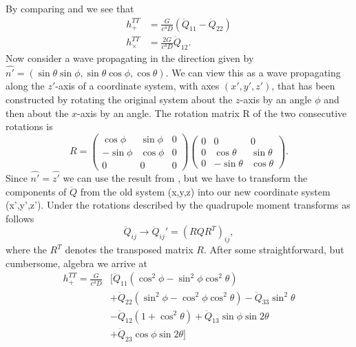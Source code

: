 By comparing  and  we see that
\begin{align} \label{eqT:zhchx}
h_{+}^{TT} &= \frac{G}{c^4 D} (\ddot{Q}_{11}-\ddot{Q}_{22}) \\ \nonumber
h_{\times}^{TT} &= \frac{2G}{c^4 D} \ddot{Q}_{12}.
\end{align}
Now consider a wave propagating in the direction given by $\hat{n'} = (\sin{\theta} \sin{\phi}, \sin{\theta} \cos{\phi},\cos{\theta})$.
We can view this as a wave propagating along the $z'$-axis of a coordinate system, with axes $(x',y',z')$, that has been constructed  
by rotating the original system about the $z$-axis by an angle $\phi$ and then about the $x$-axis by an angle.
The rotation matrix R of the two consecutive rotations is
\begin{equation} \label{eqT:pjz}
R = 
  \begin{pmatrix}
    \cos{\phi} & \sin{\phi} & 0  \\
    -\sin{\phi} & \cos{\phi} & 0 \\
    0 & 0 & 0
  \end{pmatrix}
  \begin{pmatrix}
    0 & 0 & 0  \\
    0& \cos{\theta} & \sin{\theta} \\
    0 & -\sin{\theta} & \cos{\theta}
  \end{pmatrix}.
\end{equation}
Since $\hat{n'} = \hat{z'}$ we can use the result from , but we have to
transform the components of $\ddot{Q}$ from the old system (x,y,z) into our new coordinate system (x',y',z').
Under the rotations described by  the quadrupole moment transforms as follows
\begin{equation}
\ddot{Q}_{ij} \rightarrow \ddot{Q}_{ij}' = (R Q R^T)_{ij},
\end{equation}
where the $R^T$ denotes the transposed matrix $R$.
After some straightforward, but cumbersome, algebra we arrive at
\begin{align}
\label{eqT:hp}
h_{+}^{TT} = \frac{G}{c^4 D} & \Big[ \ddot{Q}_{11} (\cos^2{\phi} - \sin^2{\phi} \cos^2{\theta})  \\ \nonumber
& + \ddot{Q}_{22} (\sin^2{\phi} - \cos^2{\phi} \cos^2{\theta}) - \ddot{Q}_{33} \sin^2{\theta} \\ \nonumber
& - \ddot{Q}_{12} (1 + \cos^2{\theta}) + \ddot{Q}_{13} \sin{\phi} \sin{2\theta} \\ \nonumber
& + \ddot{Q}_{23} \cos{\phi} \sin{2\theta} \Big]
\end{align}
